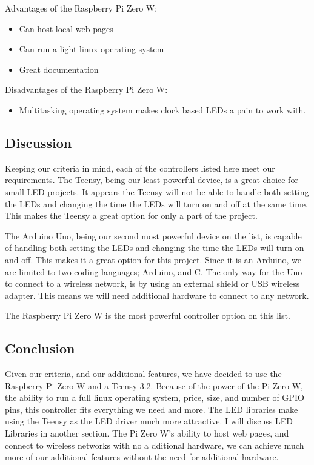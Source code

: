 \documentclass[onecolumn, draftclsnofoot,10pt, compsoc]{IEEEtran}
\begin{document}
		\vspace{5mm}
		\noindent Advantages of the Raspberry Pi Zero W:
		\begin{itemize}
			\item Can host local web pages
			\item Can run a light linux operating system
			\item Great documentation
		\end{itemize}
		Disadvantages of the Raspberry Pi Zero W:
		\begin{itemize}
			\item Multitasking operating system makes clock based LEDs a pain to
			work with.
		\end{itemize}

		\subsection{Discussion}
		\noindent Keeping our criteria in mind, each of the controllers listed here meet our
		requirements. The Teensy, being our least powerful device, is a great choice
		for small LED projects. It appears the Teensy will not be able to handle
		both setting the LEDs and changing the time the LEDs will turn on and off
		at the same time. This makes the Teensy a great option for only a part of
		the project.

		\vspace{5mm}
		\noindent The Arduino Uno, being our second most powerful device on the list, is
		capable of handling both setting the LEDs and changing the time the LEDs
		will turn on and off. This makes it a great option for this project. Since
		it is an Arduino, we are limited to two coding languages; Arduino, and C.
		The only way for the Uno to connect to a wireless network, is by using an
		external shield or USB wireless adapter. This means we will need additional
		hardware to connect to any network.


		\vspace{5mm}
		\noindent The Raspberry Pi Zero W is the most powerful controller option on this
		list.
		\subsection{Conclusion}
		\noindent Given our criteria, and our additional features, we have decided
		to use the Raspberry Pi Zero W and a Teensy 3.2. Because of the power of the
		Pi Zero W, the ability to run a full linux operating system, price, size,
		and number of GPIO pins, this controller fits everything we need and more.
		The LED libraries make using the Teensy as the LED driver much more
		attractive. I will discuss LED Libraries in another section. The Pi Zero
		W's ability to host web pages, and connect to wireless networks with no a
		dditional hardware, we can achieve much more of our additional features
		without the need for additional hardware.
\end{document}
